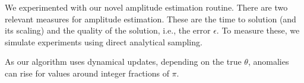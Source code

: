 We experimented with our novel amplitude estimation routine. There are two relevant measures for amplitude estimation.
These are the time to solution (and its scaling) and the quality of the solution, i.e., the error $\epsilon$.
To measure these, we simulate experiments using direct analytical sampling.


As our algorithm uses dynamical updates, depending on the true $\theta$, %
anomalies can rise for values around integer fractions of $\pi$.
